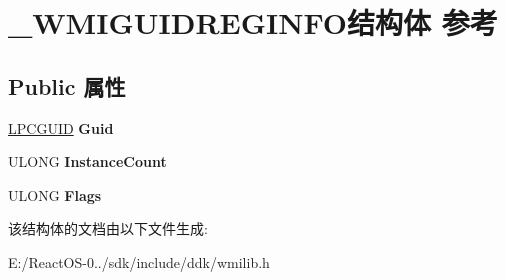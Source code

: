 \hypertarget{struct___w_m_i_g_u_i_d_r_e_g_i_n_f_o}{}\section{\+\_\+\+W\+M\+I\+G\+U\+I\+D\+R\+E\+G\+I\+N\+F\+O结构体 参考}
\label{struct___w_m_i_g_u_i_d_r_e_g_i_n_f_o}
\subsection*{Public 属性}
\begin{DoxyCompactItemize}
\item 
\mbox{\label{struct___w_m_i_g_u_i_d_r_e_g_i_n_f_o_a248fe5b1ec3790a8785314c1b030e502}} 
\hyperlink{interface_g_u_i_d}{L\+P\+C\+G\+U\+ID} {\bfseries Guid}
\item 
\mbox{\label{struct___w_m_i_g_u_i_d_r_e_g_i_n_f_o_aff3e4250fe2ccf880e43a33490021be3}} 
U\+L\+O\+NG {\bfseries Instance\+Count}
\item 
\mbox{\label{struct___w_m_i_g_u_i_d_r_e_g_i_n_f_o_a4b0a3211f85ada993d1311c327c98595}} 
U\+L\+O\+NG {\bfseries Flags}
\end{DoxyCompactItemize}


该结构体的文档由以下文件生成\+:\begin{DoxyCompactItemize}
\item 
E\+:/\+React\+O\+S-\/0../sdk/include/ddk/wmilib.\+h\end{DoxyCompactItemize}

